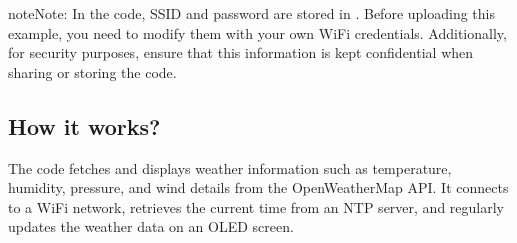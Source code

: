 \documentclass[a4paper,11pt,english]{sphinxmanual}
\begin{document}
\begin{sphinxadmonition}{note}{Note:}
\sphinxAtStartPar
In the code, SSID and password are stored in . Before uploading this example, you need to modify them with your own WiFi credentials. Additionally, for security purposes, ensure that this information is kept confidential when sharing or storing the code.
\end{sphinxadmonition}


\subsection{How it works?}
\label{\detokenize{Extension_Project/Real-time_Weather_OLED:how-it-works}}
\sphinxAtStartPar
The code fetches and displays weather information such as temperature, humidity, pressure, and wind details from the OpenWeatherMap API. It connects to a WiFi network, retrieves the current time from an NTP server, and regularly updates the weather data on an OLED screen.
\end{document}
